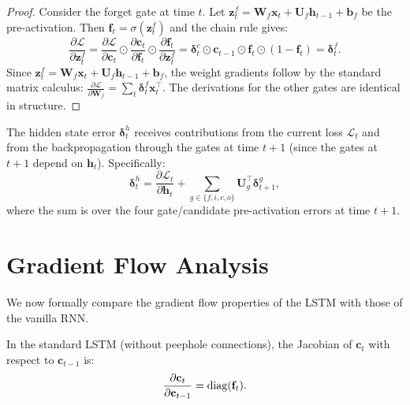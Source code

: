 \documentclass[11pt,a4paper]{article}
\begin{document}
\begin{proof}
Consider the forget gate at time $t$.  Let
$\mathbf{z}_t^f = \mathbf{W}_f \mathbf{x}_t +
\mathbf{U}_f \mathbf{h}_{t-1} + \mathbf{b}_f$ be the
pre-activation.  Then $\mathbf{f}_t = \sigma(\mathbf{z}_t^f)$
and the chain rule gives:
\[
  \frac{\partial \mathcal{L}}{\partial \mathbf{z}_t^f}
    = \frac{\partial \mathcal{L}}{\partial \mathbf{c}_t}
      \odot \frac{\partial \mathbf{c}_t}{\partial \mathbf{f}_t}
      \odot \frac{\partial \mathbf{f}_t}{\partial \mathbf{z}_t^f}
    = \boldsymbol{\delta}_t^c \odot \mathbf{c}_{t-1} \odot
      \mathbf{f}_t \odot (1 - \mathbf{f}_t)
    = \boldsymbol{\delta}_t^f.
\]
Since $\mathbf{z}_t^f = \mathbf{W}_f \mathbf{x}_t +
\mathbf{U}_f \mathbf{h}_{t-1} + \mathbf{b}_f$, the weight
gradients follow by the standard matrix calculus:
$\frac{\partial \mathcal{L}}{\partial \mathbf{W}_f} =
\sum_{t} \boldsymbol{\delta}_t^f \mathbf{x}_t^\top$.
The derivations for the other gates are identical in structure.
\end{proof}

\begin{remark}
The hidden state error $\boldsymbol{\delta}_t^h$ receives
contributions from the current loss $\mathcal{L}_t$ and from the
backpropagation through the gates at time $t + 1$ (since the gates
at $t + 1$ depend on $\mathbf{h}_t$).  Specifically:
\begin{equation}
  \boldsymbol{\delta}_t^h = \frac{\partial \mathcal{L}_t}
    {\partial \mathbf{h}_t} + \sum_{g \in \{f,i,c,o\}}
    \mathbf{U}_g^\top \boldsymbol{\delta}_{t+1}^g,
  \label{eq:delta-h-full}
\end{equation}
where the sum is over the four gate/candidate pre-activation
errors at time $t + 1$.
\end{remark}

\section{Gradient Flow Analysis}
\label{sec:gradient-flow}

We now formally compare the gradient flow properties of the LSTM
with those of the vanilla RNN.

\begin{theorem}
\label{thm:lstm-jacobian}
In the standard LSTM (without peephole connections), the Jacobian of
$\mathbf{c}_t$ with respect to $\mathbf{c}_{t-1}$ is:
\begin{equation}
  \frac{\partial \mathbf{c}_t}{\partial \mathbf{c}_{t-1}}
    = \operatorname{diag}(\mathbf{f}_t).
  \label{eq:lstm-jacobian}
\end{equation}
\end{theorem}
\end{document}

